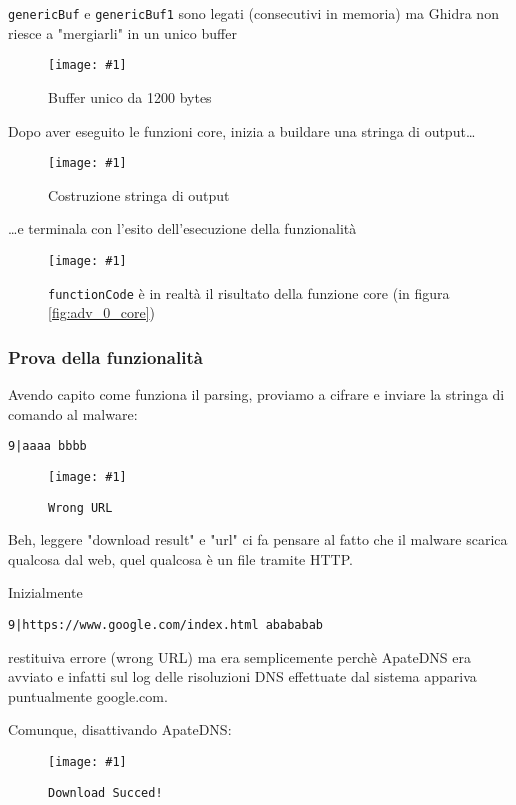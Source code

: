\documentclass[
    a4paper, %
    11pt %
]{article}
\newcommand{\pic}[4]{\begin{figure}[H]
            \centering
            \texttt{[image: \#1]}
            \caption{#2}
            \label{fig:#1}
            \end{figure}}
\begin{document}
            \texttt{genericBuf} e \texttt{genericBuf1} sono legati (consecutivi in memoria) ma Ghidra non riesce 
            a "mergiarli" in un unico buffer
            
            \pic{adv_0_bufs}{Buffer unico da 1200 bytes}{6cm}{1.5cm}

            Dopo aver eseguito le funzioni core, inizia a buildare una stringa di output\dots

            \pic{adv_0_startstr}{Costruzione stringa di output}{10cm}{6cm}

            \dots e terminala con l'esito dell'esecuzione della funzionalità

            \pic{adv_0_finstr}{\texttt{functionCode} è in realtà il risultato della funzione core (in figura \ref{fig:adv_0_core})}{10cm}{6cm}

            \subsubsection{Prova della funzionalità}

            Avendo capito come funziona il parsing, proviamo a cifrare e inviare la stringa di comando al malware:

            \begin{center}
            \texttt{9|aaaa bbbb}
            \end{center}
            
            \pic{adv_0_cmd_res}{\texttt{Wrong URL}}{19cm}{1.5cm}

            Beh, leggere "download result" e "url" ci fa pensare al fatto che il malware scarica qualcosa
            dal web, quel qualcosa è un file tramite HTTP.

            Inizialmente 
            
            \begin{center}
            \texttt{9|https://www.google.com/index.html abababab}
            \end{center} 
            
            restituiva errore (wrong URL)
            ma era semplicemente perchè ApateDNS era avviato e infatti sul log delle risoluzioni DNS effettuate
            dal sistema appariva puntualmente google.com.

            Comunque, disattivando ApateDNS:
            
            \pic{adv_0_success}{\texttt{Download Succed!}}{19cm}{1cm}
\end{document}
